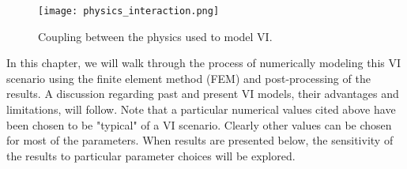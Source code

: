 \begin{figure}[htb!]
  \centering
  \texttt{[image: physics\_interaction.png]}
  \caption{Coupling between the physics used to model VI.}
  \label{fig:physics_overview}
\end{figure}

In this chapter, we will walk through the process of numerically modeling this VI scenario using the finite element method (FEM) and post-processing of the results.
A discussion regarding past and present VI models, their advantages and limitations, will follow.
Note that a particular numerical values cited above have been chosen to be "typical" of a VI scenario.
Clearly other values can be chosen for most of the parameters.
When results are presented below, the sensitivity of the results to particular parameter choices will be explored.\par
